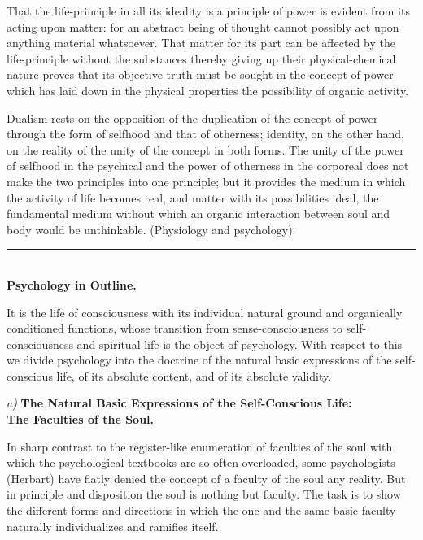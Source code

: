 \documentclass[12pt,a4paper,openany]{book}
\newcommand{\opage}[1]{\marginnote{\footnotesize\textit{[#1]}}}
\begin{document}
That the life-principle in all its ideality is a principle of power is evident from its acting upon matter: for an
abstract being of thought cannot possibly act upon anything material whatsoever. That matter for its part can be
affected by the life-principle without the substances thereby giving up their physical-chemical nature proves that its
objective truth must be sought in the concept of power which has laid down in the physical properties the possibility
of organic activity.

Dualism rests on the opposition of the duplication of the concept of power through the form of selfhood and that of
otherness; identity, on the other hand, on the reality of the unity of the concept in both forms. The unity of the power
of selfhood in the psychical and the power of otherness in the corporeal does not make the two principles
\opage{6}into one principle; but it provides the medium in which the activity of life becomes real, and matter with its
possibilities ideal, the fundamental medium without which an organic interaction between soul and body would be
unthinkable.
(Physiology and psychology).

\begin{center}
\rule{4em}{0.4pt}\\[0.6em]
\textbf{Psychology in Outline.}
\end{center}

It is the life of consciousness with its individual natural ground and organically conditioned functions, whose
transition from sense-consciousness to self-consciousness and spiritual life is the object of psychology. With respect
to this we divide psychology into the doctrine of the natural basic expressions of the self-conscious life, of its
absolute content, and of its absolute validity.

\begin{center}
\textit{a)} \textbf{The Natural Basic Expressions of the Self-Conscious Life:}\\
\textbf{The Faculties of the Soul.}
\end{center}

In sharp contrast to the register-like enumeration of faculties of the soul with which the psychological textbooks are
so often overloaded, some psychologists (Herbart) have flatly denied the concept of a faculty of the soul any reality.
But in principle and disposition the soul is nothing but faculty. The task is to show the different forms and
directions in which the one and the same basic faculty naturally individualizes and ramifies itself.
\end{document}
